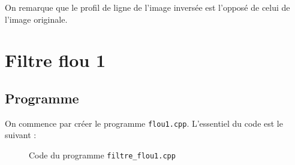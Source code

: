 \documentclass[french,a4paper,10pt]{article}
\begin{document}
    On remarque que le profil de ligne de l'image inversée est l'opposé de celui de l'image originale.

    \newpage
    \section{Filtre flou 1}\label{sec:3}

    \subsection{Programme}\label{subsec:3.1}

    On commence par créer le programme \texttt{flou1.cpp}.
    L'essentiel du code est le suivant :
    \begin{figure}[!htb]
        \centering
        \caption{Code du programme \texttt{filtre\_flou1.cpp}}\label{Fig:code-filtre-flou1}
    \end{figure}
\end{document}
